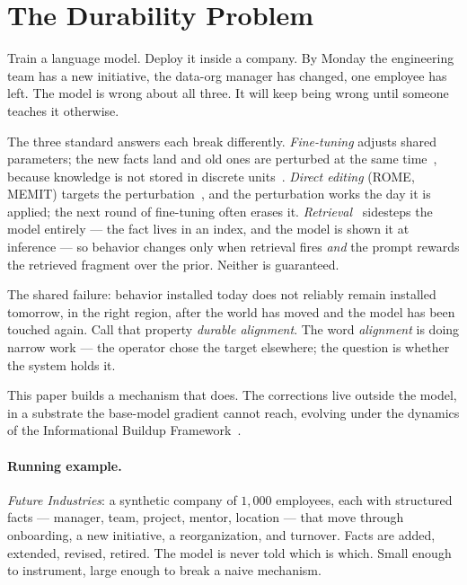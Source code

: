 \documentclass[11pt,twocolumn]{article}
\theoremstyle{plain}
\begin{document}
\section{The Durability Problem}
\label{sec:problem}

Train a language model. Deploy it inside a company. By Monday the engineering team has a new initiative, the data-org manager has changed, one employee has left. The model is wrong about all three. It will keep being wrong until someone teaches it otherwise.

The three standard answers each break differently. \emph{Fine-tuning} adjusts shared parameters; the new facts land and old ones are perturbed at the same time~\cite{kirkpatrick2017overcoming, ramasesh2020anatomy}, because knowledge is not stored in discrete units~\cite{brown2020language, touvron2023llama}. \emph{Direct editing} (ROME, MEMIT) targets the perturbation~\cite{meng2022locating, meng2023mass}, and the perturbation works the day it is applied; the next round of fine-tuning often erases it. \emph{Retrieval}~\cite{lewis2020retrieval} sidesteps the model entirely --- the fact lives in an index, and the model is shown it at inference --- so behavior changes only when retrieval fires \emph{and} the prompt rewards the retrieved fragment over the prior. Neither is guaranteed.

The shared failure: behavior installed today does not reliably remain installed tomorrow, in the right region, after the world has moved and the model has been touched again. Call that property \emph{durable alignment}. The word \emph{alignment} is doing narrow work --- the operator chose the target elsewhere; the question is whether the system holds it.

This paper builds a mechanism that does. The corrections live outside the model, in a substrate the base-model gradient cannot reach, evolving under the dynamics of the Informational Buildup Framework~\cite{negulescu2026ibf}.

\paragraph{Running example.}
\emph{Future Industries}: a synthetic company of $1{,}000$ employees, each with structured facts --- manager, team, project, mentor, location --- that move through onboarding, a new initiative, a reorganization, and turnover. Facts are added, extended, revised, retired. The model is never told which is which. Small enough to instrument, large enough to break a naive mechanism.
\end{document}
